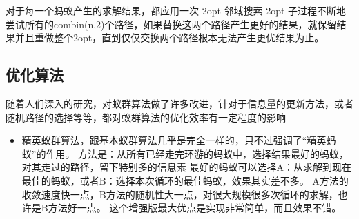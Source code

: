 \documentclass[12pt,nofonts]{ctexart}
\begin{document}
对于每一个蚂蚁产生的求解结果，都应用一次 2opt 邻域搜索
2opt 子过程不断地尝试所有的combin(n,2)个路径，如果替换这两个路径产生更好的结果，就保留结果并且重做整个2opt，直到仅仅交换两个路径根本无法产生更优结果为止。
\subsection{优化算法}
随着人们深入的研究，对蚁群算法做了许多改进，针对于信息量的更新方法，或者随机路径的选择等等，都对蚁群算法的优化效率有一定程度的影响
\begin{itemize}
		\item<1> 精英蚁群算法，跟基本蚁群算法几乎是完全一样的，只不过强调了“精英蚂蚁”的作用。
方法是：从所有已经走完环游的蚂蚁中，选择结果最好的蚂蚁，对其走过的路径，留下特别多的信息素
最好的蚂蚁可以选择A：从求解到现在最佳的蚂蚁，或者B：选择本次循环的最佳蚂蚁，效果其实差不多。
A方法的收敛速度快一点，B方法的随机性大一点，对很大规模很多次循环的求解，也许是B方法好一点。
这个增强版最大优点是实现非常简单，而且效果不错。


\end{itemize}
\end{document}
